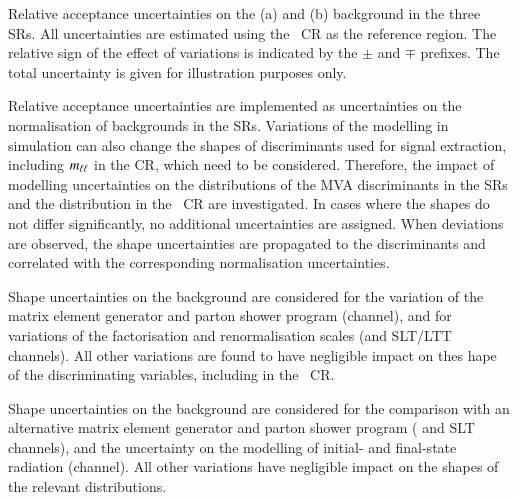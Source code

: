 \begin{table}[htbp]
  \centering

  \caption{Relative acceptance uncertainties on the \ZHF (a) and \ttbar (b)
    background in the three SRs. All uncertainties are estimated using the
    \ZHF~CR as the reference region. The relative sign of the effect of
    variations is indicated by the $\pm$ and $\mp$ prefixes. The total
    uncertainty is given for illustration purposes only.}

  \begin{subtable}[t]{0.95\textwidth}
    \centering
    \label{tab:uncertainties_zhf_extrapol}

    
  \end{subtable}

  \vspace{12pt}

  \begin{subtable}[t]{0.95\textwidth}
    \centering
    \label{tab:uncertainties_ttbar_extrapol}

    
  \end{subtable}
\end{table}

Relative acceptance uncertainties are implemented as uncertainties on the
normalisation of backgrounds in the SRs. Variations of the modelling in
simulation can also change the shapes of discriminants used for signal
extraction, including $m_{\ell\ell}$ in the \ZHF CR, which need to be
considered. Therefore, the impact of modelling uncertainties on the
distributions of the MVA discriminants in the SRs and the \mll distribution in
the \ZHF~CR are investigated. In cases where the shapes do not differ
significantly, no additional uncertainties are assigned. When deviations are
observed, the shape uncertainties are propagated to the discriminants and
correlated with the corresponding normalisation uncertainties.

Shape uncertainties on the \ZHF background are considered for the variation of
the matrix element generator and parton shower program (\hadhad channel), and
for variations of the factorisation and renormalisation scales (\hadhad and
\lephad SLT/LTT channels). All other variations are found to have negligible
impact on thes hape of the discriminating variables, including \mll in the
\ZHF~CR.

Shape uncertainties on the \ttbar background are considered for the comparison
with an alternative matrix element generator and parton shower program (\hadhad
and \lephad SLT channels), and the uncertainty on the modelling of initial- and
final-state radiation (\hadhad channel). All other variations have negligible
impact on the shapes of the relevant distributions.


